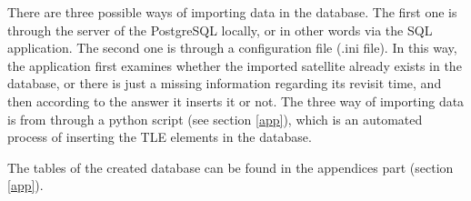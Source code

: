 There are three possible ways of importing data in the database. The first one is through the server of the PostgreSQL locally, or in other words via the SQL application. The second one is through a configuration file (.ini file). In this way, the application first examines whether the imported satellite already exists in the database, or there is just a missing information regarding its revisit time, and then according to the answer it inserts it or not. The three way of importing data is from through a python script (see section \ref{app}), which is an automated process of inserting the TLE elements in the database.


\bigskip
The tables of the created database can be found in the appendices part (section \ref{app}).
